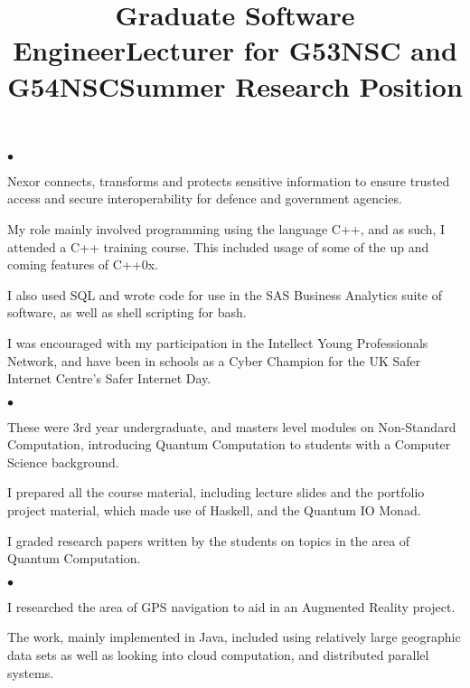 \documentclass[line]{res}
\newenvironment{list2}{
  \begin{list}{$\bullet$}{%
      \setlength{\itemsep}{0in}
      \setlength{\parsep}{0.045in} \setlength{\parskip}{0in}
      \setlength{\topsep}{0in} \setlength{\partopsep}{0in}
      \setlength{\leftmargin}{0.2in}}}{\end{list}}
\begin{document}
\begin{resume}
\title{Graduate Software Engineer}
\begin{position}
\vspace{-4mm}
\begin{list2}
\item Nexor connects, transforms and protects sensitive information to
  ensure trusted access and secure interoperability for defence and
  government agencies. 
\item My role mainly involved programming using the language C++,  and
  as such, I attended a C++ training course. This included usage of
  some of the up and coming features of C++0x.
\item I also used SQL and wrote code for use in the SAS
  Business Analytics suite of software, as well as shell scripting for
  bash.
\item I was encouraged with my participation in the Intellect
  Young Professionals Network, and have been in schools as a Cyber
  Champion for the UK Safer Internet Centre's Safer Internet Day.
\end{list2}
\end{position}

\title{Lecturer for G53NSC and G54NSC}
\begin{position}
\vspace{-4mm}
\begin{list2}
\item These were 3rd year undergraduate, and masters level 
  modules on Non-Standard Computation, introducing Quantum
  Computation to students with a Computer Science background.
\item I prepared all the course material, including lecture slides and
  the portfolio project material, which made use of Haskell, and the 
  Quantum IO Monad.
\item I graded research papers written by the students on topics
  in the area of Quantum Computation.
\end{list2}
\end{position}

 
\title{Summer Research Position}
\begin{position}
\vspace{-4mm}
\begin{list2}
\item I researched the area of GPS navigation to aid in an Augmented
  Reality project.
\item The work, mainly implemented in Java, included using relatively
  large geographic data sets as well as looking into cloud
  computation, and distributed parallel systems.
\end{list2}
\end{position}


\end{resume}
\end{document}
